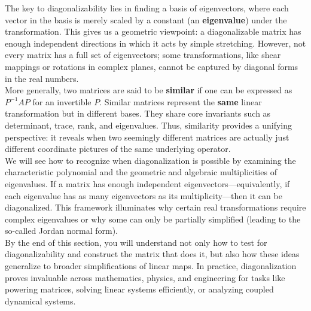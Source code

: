 \documentclass[a4paper, 9pt]{extarticle}
\begin{document}
\noindent The key to diagonalizability lies in finding a basis of eigenvectors, where each vector in the basis is merely scaled by a constant (an \textbf{eigenvalue}) under the transformation. This gives us a geometric viewpoint: a diagonalizable matrix has enough independent directions in which it acts by simple stretching. However, not every matrix has a full set of eigenvectors; some transformations, like shear mappings or rotations in complex planes, cannot be captured by diagonal forms in the real numbers. \\[2ex]
\noindent More generally, two matrices are said to be \textbf{similar} if one can be expressed as $P^{-1}AP$ for an invertible $P$. Similar matrices represent the \textbf{same} linear transformation but in different bases. They share core invariants such as determinant, trace, rank, and eigenvalues. Thus, similarity provides a unifying perspective: it reveals when two seemingly different matrices are actually just different coordinate pictures of the same underlying operator. \\[2ex]

\noindent We will see how to recognize when diagonalization is possible by examining the characteristic polynomial and the geometric and algebraic multiplicities of eigenvalues. If a matrix has enough independent eigenvectors—equivalently, if each eigenvalue has as many eigenvectors as its multiplicity—then it can be diagonalized. This framework illuminates why certain real transformations require complex eigenvalues or why some can only be partially simplified (leading to the so-called Jordan normal form). \\[2ex]

\noindent By the end of this section, you will understand not only how to test for diagonalizability and construct the matrix that does it, but also how these ideas generalize to broader simplifications of linear maps. In practice, diagonalization proves invaluable across mathematics, physics, and engineering for tasks like powering matrices, solving linear systems efficiently, or analyzing coupled dynamical systems.\\[2ex]
\end{document}
